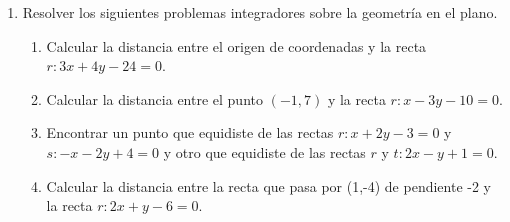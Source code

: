 \documentclass[a4paper]{article}
\newcommand{\exercise}{\item}
\begin{document}
\begin{enumerate}
\begin{multicols}{2}
\begin{enumerate} [label=(\alph*)]
		\item $(x,y)=\lambda(1,2)+(0,3)$ con $\lambda\in\mathbb{Z}$

		\item $(x,y)=k(1,2)+(-1,3)$ con $k\in[-1,1]$

		\item $y=mx+2$ con $m\in[0,1)$

		\item $y=2x+b$ con $b\in[-2,1]$

		\item $R=\{(x,y) \in \mathbb{R}^2 ~|~ -x+y-5=0 ~\land~ 2x+y-17=0 \}$

		\item $S=\{(x,y) \in \mathbb{R}^2 ~|~ -x+y-5=0 ~\lor~ 2x+y-17=0 \}$

		\item $\left\{\begin{matrix}-x+y-5=0 \\ 2x+y-17=0 \\ x+2y-10=0 \end{matrix}\right.$

		\item $\left\{\begin{matrix}-x+y-5=0 \\ 2x+y-17=0 \\ x+2y-17=0 \\ 3x+3y-34=0 \end{matrix}\right.$
	
		
	\end{enumerate}
	\end{multicols}

	\exercise Resolver los siguientes problemas integradores sobre la geometría en el plano.
	\begin{enumerate} [label=(\alph*)]
		
		\item Calcular la distancia entre el origen de coordenadas y la recta $r: 3x+4y -24=0$.

		\item Calcular la distancia entre el punto $(-1,7)$ y la recta $r: x-3y -10=0$.

		\item Encontrar un punto que equidiste de las rectas $r: x+2y-3=0$ y $s: -x-2y+4=0$ y otro que equidiste de las rectas $r$ y $t: 2x-y+1=0$.

		\item Calcular la distancia entre la recta que pasa por (1,-4) de pendiente -2 y la recta $r: 2x+y-6=0$.


\end{enumerate}
\end{enumerate}
\end{document}
